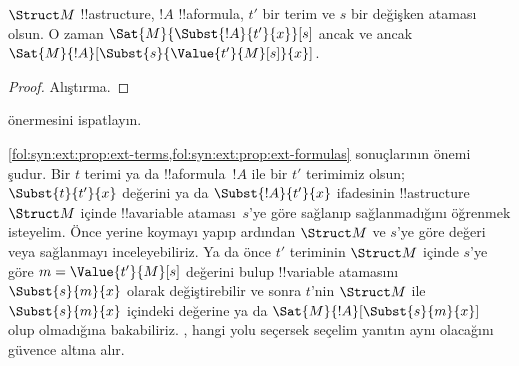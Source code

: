 \begin{prop} $\Struct M$ !!a{structure},
$!A$ !!a{formula}, $t'$ bir terim ve $s$ bir değişken ataması olsun.
O zaman $\Sat{M}{\Subst{!A}{t'}{x}}[s]$ ancak ve ancak
$\Sat{M}{!A}[\Subst{s}{\Value{t'}{M}[s]}{x}]$.
\end{prop}

\begin{proof}
Alıştırma.
\end{proof}

\begin{prob}
 önermesini ispatlayın.
\end{prob}

\begin{explain}
  \cref{fol:syn:ext:prop:ext-terms,fol:syn:ext:prop:ext-formulas}
  sonuçlarının önemi şudur. Bir $t$ terimi ya da !!a{formula}~$!A$ ile
  bir $t'$ terimimiz olsun; $\Subst{t}{t'}{x}$ değerini ya da
  $\Subst{!A}{t'}{x}$ ifadesinin !!a{structure}~$\Struct M$ içinde
  !!a{variable} ataması~$s$'ye göre sağlanıp sağlanmadığını öğrenmek
  isteyelim. Önce yerine koymayı yapıp ardından $\Struct M$ ve $s$'ye
  göre değeri veya sağlanmayı inceleyebiliriz. Ya da önce $t'$ teriminin
  $\Struct M$ içinde $s$'ye göre $m=\Value{t'}{M}[s]$ değerini bulup
  !!{variable} atamasını $\Subst{s}{m}{x}$ olarak değiştirebilir ve
  sonra $t$'nin $\Struct M$ ile $\Subst{s}{m}{x}$ içindeki değerine ya
  da $\Sat{M}{!A}[\Subst{s}{m}{x}]$ olup olmadığına bakabiliriz.
  ,
  hangi yolu seçersek seçelim yanıtın aynı olacağını güvence altına alır.
\end{explain}

